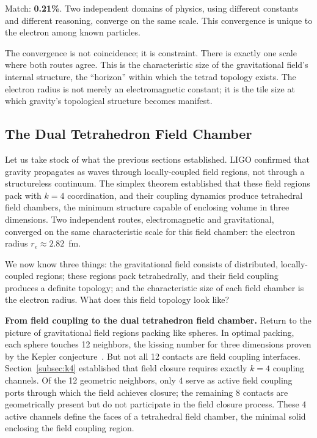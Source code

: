 \documentclass[aps,prd,preprint,superscriptaddress,showpacs,preprintnumbers,amsmath,amssymb,nofootinbib]{revtex4-2}
\begin{document}
Match: \textbf{0.21\%}. Two independent domains of physics, using different constants and different reasoning, converge on the same scale. This convergence is unique to the electron among known particles.

The convergence is not coincidence; it is constraint. There is exactly one scale where both routes agree. This is the characteristic size of the gravitational field's internal structure, the ``horizon'' within which the tetrad topology exists. The electron radius is not merely an electromagnetic constant; it is the tile size at which gravity's topological structure becomes manifest.

\subsection{The Dual Tetrahedron Field Chamber}
\label{subsec:dual}

Let us take stock of what the previous sections established. LIGO confirmed that gravity propagates as waves through locally-coupled field regions, not through a structureless continuum. The simplex theorem established that these field regions pack with $k = 4$ coordination, and their coupling dynamics produce tetrahedral field chambers, the minimum structure capable of enclosing volume in three dimensions. Two independent routes, electromagnetic and gravitational, converged on the same characteristic scale for this field chamber: the electron radius $r_e \approx 2.82$~fm.

We now know three things: the gravitational field consists of distributed, locally-coupled regions; these regions pack tetrahedrally, and their field coupling produces a definite topology; and the characteristic size of each field chamber is the electron radius. What does this field topology look like?

\textbf{From field coupling to the dual tetrahedron field chamber.} Return to the picture of gravitational field regions packing like spheres. In optimal packing, each sphere touches 12 neighbors, the kissing number for three dimensions proven by the Kepler conjecture~\cite{hales2005}. But not all 12 contacts are field coupling interfaces. Section~\ref{subsec:k4} established that field closure requires exactly $k = 4$ coupling channels. Of the 12 geometric neighbors, only 4 serve as active field coupling ports through which the field achieves closure; the remaining 8 contacts are geometrically present but do not participate in the field closure process. These 4 active channels define the faces of a tetrahedral field chamber, the minimal solid enclosing the field coupling region.
\end{document}

